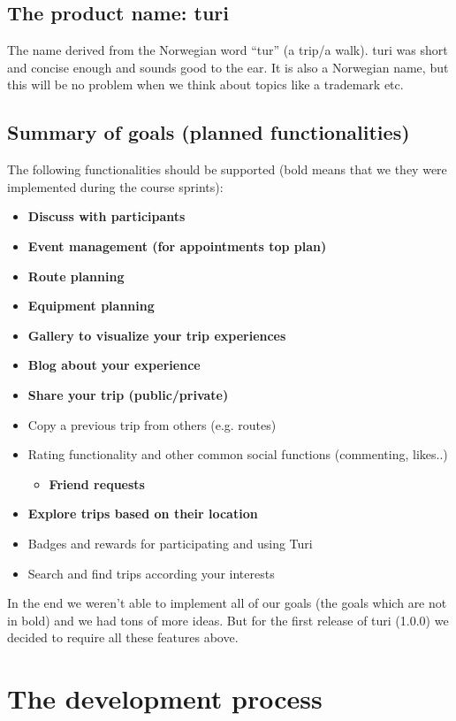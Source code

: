 \documentclass[a4paper]{article}
\begin{document}
\subsection{The product name: turi}
The name derived from the Norwegian word “tur” (a trip/a walk). turi was short and concise enough and sounds good to the ear. It is also a Norwegian name, but this will be no problem when we think about topics like a trademark etc.

\subsection{Summary of goals (planned functionalities)}
The following functionalities should be supported (bold means that we they were implemented during the course sprints):
\begin{itemize}
  \item {\textbf{Discuss with participants}}
  \item {\textbf{Event management (for appointments top plan)}}
  \item {\textbf{Route planning}}
  \item {\textbf{Equipment planning}}
  \item {\textbf{Gallery to visualize your trip experiences}}
  \item {\textbf{Blog about your experience}}
  \item {\textbf{Share your trip (public/private)}}
  \item {Copy a previous trip from others (e.g. routes)}
  \item {Rating functionality and other common social functions (commenting, likes..)
  \begin{itemize}
    \item {\textbf{Friend requests}}
  \end{itemize}}
  \item {\textbf{Explore trips based on their location}}
  \item {Badges and rewards for participating and using Turi}
  \item {Search and find trips according your interests}
\end{itemize}

\noindent
In the end we weren't able to implement all of our goals (the goals which are not in bold) and we had tons of more ideas. But for the first release of turi (1.0.0) we decided to require all these features above.\\

\section{The development process}
\end{document}
